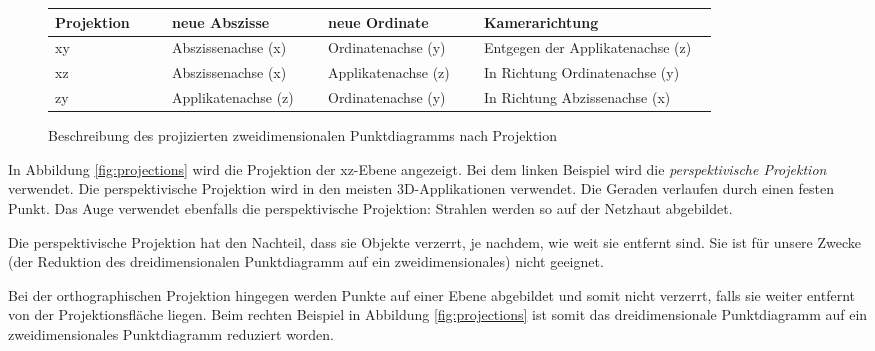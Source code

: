 \begin{figure}[H]
	\centering
	\begin{tabular}{ | m{0.15\linewidth} | m{0.2\linewidth} |m{0.2\linewidth} | m{0.3\linewidth} |}
		\hline
		\textbf{Projektion} & \textbf{neue Abszisse} & \textbf{neue Ordinate} & \textbf{Kamerarichtung}\\ \hline
		xy & Abszissenachse (x) & Ordinatenachse (y) & Entgegen der Applikatenachse (z) \\ \hline
		xz & Abszissenachse (x) & Applikatenachse (z) & In Richtung Ordinatenachse (y)\\ \hline
		zy & Applikatenachse (z) & Ordinatenachse (y) & In Richtung Abzissenachse (x) \\ \hline
	\end{tabular}
	\caption{Beschreibung des projizierten zweidimensionalen Punktdiagramms nach Projektion}
	\label{fig:3dtable}
\end{figure}

In Abbildung \ref{fig:projections} wird die Projektion der xz-Ebene angezeigt. Bei dem linken Beispiel wird die \textit{perspektivische Projektion} verwendet. Die perspektivische Projektion wird in den meisten 3D-Applikationen verwendet. Die Geraden verlaufen durch einen festen Punkt. Das Auge verwendet ebenfalls die perspektivische Projektion: Strahlen werden so auf der Netzhaut abgebildet.

Die perspektivische Projektion hat den Nachteil, dass sie Objekte verzerrt, je nachdem, wie weit sie entfernt sind. Sie ist für unsere Zwecke (der Reduktion des dreidimensionalen Punktdiagramm auf ein zweidimensionales) nicht geeignet.

Bei der orthographischen Projektion hingegen werden Punkte auf einer Ebene abgebildet und somit nicht verzerrt, falls sie weiter entfernt von der Projektionsfläche liegen. Beim rechten Beispiel in Abbildung \ref{fig:projections} ist somit das dreidimensionale Punktdiagramm auf ein zweidimensionales Punktdiagramm reduziert worden.

